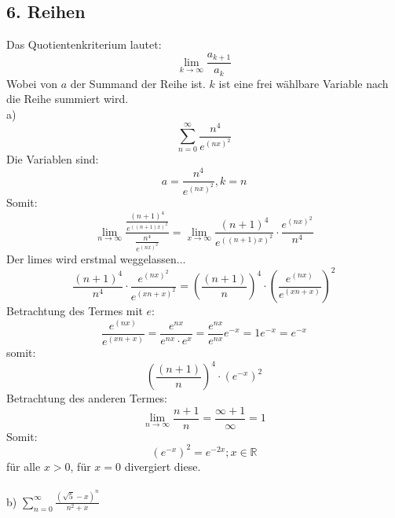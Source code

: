 \documentclass{article}
\begin{document}
    \subsection*{6. Reihen}
    Das Quotientenkriterium lautet:
    \begin{equation*}
        \lim_{k \to \infty} \frac{a_{k+1}}{a_k}
    \end{equation*}
    Wobei von $a$ der Summand der Reihe ist. $k$ ist eine frei wählbare Variable nach die Reihe summiert wird.\\
    a)
    \begin{equation*}
        \sum_{n=0}^{\infty} \frac{n^4}{e^{(nx)^2}}
    \end{equation*}
    Die Variablen sind:
    \begin{equation*}
        a = \frac{n^4}{e^{(nx)^2}}, k = n
    \end{equation*}
    Somit:
    \begin{equation*}
        \lim_{n \to \infty} \frac{\frac{(n+1)^4}{e^{((n+1)x)^2}}}{\frac{n^4}{e^{(nx)^2}}} = \lim_{x \to \infty} \frac{(n+1)^4}{e^{((n+1)x)^2}} \cdot \frac{e^{(nx)^2}}{n^4}
    \end{equation*}
    Der limes wird erstmal weggelassen...
    \begin{equation*}
        \frac{(n+1)^4}{n^4} \cdot \frac{e^{(nx)^2}}{e^{(xn+x)^2}} = \left(\frac{(n+1)}{n}\right)^4 \cdot \left(\frac{e^{(nx)}}{e^{(xn+x)}}\right)^2
    \end{equation*}
    Betrachtung des Termes mit $e$:
    \begin{equation*}
        \frac{e^{(nx)}}{e^{(xn+x)}} = \frac{e^{nx}}{e^{nx} \cdot e^x} = \frac{e^{nx}}{e^{nx}} e^{-x} = 1e^{-x} = e^{-x}
    \end{equation*}
    somit:
    \begin{equation*}
        \left(\frac{(n+1)}{n}\right)^4 \cdot \left(e^{-x}\right)^2
    \end{equation*}
    Betrachtung des anderen Termes:
    \begin{equation*}
        \lim_{n \to \infty} \frac{n+1}{n} = \frac{\infty + 1}{\infty} = 1
    \end{equation*}
    Somit:
    \begin{equation*}
        \left(e^{-x}\right)^2 = e^{-2x}; x \in \mathbb{R} 
    \end{equation*}
    für alle $x > 0$, für $x =0$ divergiert diese.\\\\
    b) $\sum_{n=0}^{\infty}\frac{(\sqrt{5}-x)^n}{n^2+x}$
\end{document}
